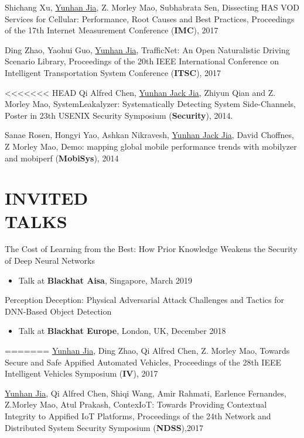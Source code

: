 \documentclass[margin]{res}
\begin{document}
\begin{resume}
Shichang Xu, \underline{Yunhan Jia}, Z. Morley Mao, Subhabrata Sen,
Dissecting HAS VOD Services for Cellular: Performance, Root Causes and Best Practices, Proceedings of the 17th Internet Measurement Conference (\textbf{IMC}), 2017 \href{https://conferences.sigcomm.org/imc/2017/papers/imc17-final111.pdf}{\color{blue}{[PDF]}}

Ding Zhao, Yaohui Guo, \underline{Yunhan Jia}, 
TrafficNet: An Open Naturalistic Driving Scenario Library, Proceedings of the 20th IEEE International Conference on Intelligent Transportation System Conference (\textbf{ITSC}), 2017 \href{http://web.eecs.umich.edu/\~jackjia/material/trafficnet\_itsc17.pdf}{\color{blue}{[PDF]}}

<<<<<<< HEAD
Qi Alfred Chen, \underline{Yunhan Jack Jia}, Zhiyun Qian and Z. Morley Mao, SystemLeakalyzer: Systematically Detecting System Side-Channels, Poster in 23th USENIX Security Symposium (\textbf{Security}), 2014.

Sanae Rosen, Hongyi Yao, Ashkan Nikravesh, \underline{Yunhan Jack Jia}, David Choffnes, Z Morley Mao, Demo: mapping global mobile performance trends with mobilyzer and mobiperf (\textbf{MobiSys}), 2014
\fi

\section{INVITED\\ TALKS}


The Cost of Learning from the Best: How Prior Knowledge Weakens the Security of Deep Neural Networks
\begin{itemize}
    \item Talk at \textbf{Blackhat Aisa}, Singapore, March 2019
\end{itemize}

Perception Deception: Physical Adversarial Attack Challenges and Tactics for DNN-Based Object Detection
\begin{itemize}
    \item Talk at \textbf{Blackhat Europe}, London, UK, December 2018
\end{itemize}
=======
\underline{Yunhan Jia}, Ding Zhao, Qi Alfred Chen, Z. Morley Mao,
Towards Secure and Safe Appified Automated Vehicles, Proceedings of the 28th IEEE Intelligent Vehicles Symposium (\textbf{IV}), 2017 \href{https://arxiv.org/pdf/1702.06827.pdf}{\color{blue}{[PDF]}}

\underline{Yunhan Jia}, Qi Alfred Chen, Shiqi Wang, Amir Rahmati, Earlence Fernandes, Z.Morley Mao, Atul Prakash, 
ContexIoT: Towards Providing Contextual Integrity to Appified IoT Platforms, Proceedings of the 24th Network and Distributed System Security Symposium (\textbf{NDSS}),2017 \href{http://web.eecs.umich.edu/\~jackjia/material/contexiot\_ndss17.pdf}{\color{blue}{[PDF]}}


\end{resume}
\end{document}
